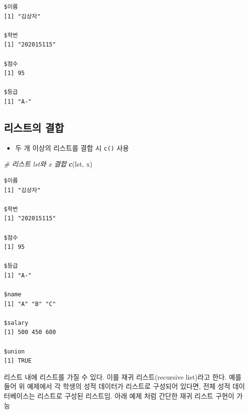 \documentclass[
  11pt,
]{krantz}
\newenvironment{Shaded}{\begin{snugshade}}{\end{snugshade}}
\newcommand{\CommentTok}[1]{\textcolor[rgb]{0.37,0.37,0.37}{\textit{#1}}}
\newcommand{\KeywordTok}[1]{\textcolor[rgb]{0.27,0.27,0.27}{\textbf{#1}}}
\newcommand{\NormalTok}[1]{#1}
\providecommand{\tightlist}{%
  \setlength{\itemsep}{0pt}\setlength{\parskip}{0pt}}
\let\BeginKnitrBlock\begin \let\EndKnitrBlock\end
\begin{document}
\begin{verbatim}
$이름
[1] "김상자"

$학번
[1] "202015115"

$점수
[1] 95

$등급
[1] "A-"
\end{verbatim}

\normalsize

\hypertarget{uxb9acuxc2a4uxd2b8uxc758-uxacb0uxd569}{%
\subsection{리스트의 결합}\label{uxb9acuxc2a4uxd2b8uxc758-uxacb0uxd569}}

\begin{itemize}
\tightlist
\item
  두 개 이상의 리스트를 결합 시 \texttt{c()} 사용
\end{itemize}

\footnotesize

\begin{Shaded}
\begin{Highlighting}[]
\CommentTok{# 리스트 lst와 x 결합}
\KeywordTok{c}\NormalTok{(lst, x)}
\end{Highlighting}
\end{Shaded}

\begin{verbatim}
$이름
[1] "김상자"

$학번
[1] "202015115"

$점수
[1] 95

$등급
[1] "A-"

$name
[1] "A" "B" "C"

$salary
[1] 500 450 600

$union
[1] TRUE
\end{verbatim}

\normalsize

\footnotesize

\BeginKnitrBlock{rmdnote}
리스트 내에 리스트를 가질 수 있다. 이를 재귀 리스트(recursive list)라고 한다. 예를 들어 위 예제에서 각 학생의 성적 데이터가 리스트로 구성되어 있다면, 전체 성적 데이터베이스는 리스트로 구성된 리스트임. 아래 예제 처럼 간단한 재귀 리스트 구현이 가능
\EndKnitrBlock{rmdnote}

\normalsize

\footnotesize
\end{document}
